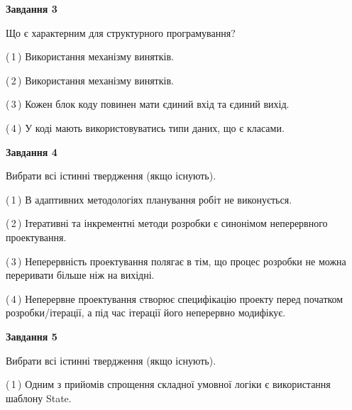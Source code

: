 \documentclass[10pt, ukrainian]{article}
\begin{document}
{\begin {large}
{\begin {center}\textbf{Завдання 3}\end {center}}\par
Що є характерним для структурного програмування?\par
\vspace{2mm}



(\,1\,) Використання механізму винятків. %



(\,2\,) Використання механізму винятків. %



(\,3\,) Кожен блок коду повинен мати єдиний вхід та єдиний вихід.%



(\,4\,) У коді мають використовуватись типи даних, що є класами. %


{\begin {center}\textbf{Завдання 4}\end {center}}\par
Вибрати всі істинні твердження (якщо існують).\par
\vspace{2mm}



(\,1\,) В адаптивних методологіях планування робіт не виконується. %



(\,2\,) Ітеративні та інкрементні методи розробки є синонімом неперервного проектування. %



(\,3\,) Неперервність проектування полягає в тім, що процес розробки не можна переривати більше ніж на вихідні. %



(\,4\,) Неперервне проектування створює специфікацію проекту перед початком розробки/ітерації, а під час ітерації його неперервно модифікує.%


{\begin {center}\textbf{Завдання 5}\end {center}}\par
Вибрати всі істинні твердження (якщо існують).\par
\vspace{2mm}



(\,1\,) Одним з прийомів спрощення складної умовної логіки є використання шаблону State. %




\end{large}}
\end{document}
